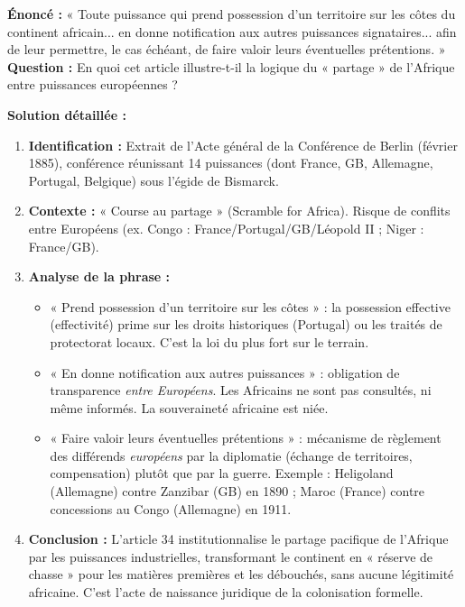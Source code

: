 \documentclass[11pt]{article}
\newcommand{\cle}[1]{{\popxbold\color{popdark}#1}}
\begin{document}
\begin{exoresolu}
\textbf{Énoncé :} « Toute puissance qui prend possession d'un territoire sur les côtes du continent africain... en donne notification aux autres puissances signataires... afin de leur permettre, le cas échéant, de faire valoir leurs éventuelles prétentions. »
\textbf{Question :} En quoi cet article illustre-t-il la logique du « partage » de l'Afrique entre puissances européennes ?

\textbf{Solution détaillée :}
\begin{enumerate}
    \item \textbf{Identification :} Extrait de l'Acte général de la Conférence de Berlin (février 1885), conférence réunissant 14 puissances (dont France, GB, Allemagne, Portugal, Belgique) sous l'égide de Bismarck.
    \item \textbf{Contexte :} « Course au partage » (Scramble for Africa). Risque de conflits entre Européens (ex. Congo : France/Portugal/GB/Léopold II ; Niger : France/GB).
    \item \textbf{Analyse de la phrase :} 
    \begin{itemize}
        \item « Prend possession d'un territoire sur les côtes » : la possession effective (\cle{effectivité}) prime sur les droits historiques (Portugal) ou les traités de protectorat locaux. C'est la loi du plus fort sur le terrain.
        \item « En donne notification aux autres puissances » : obligation de transparence \emph{entre Européens}. Les Africains ne sont pas consultés, ni même informés. La souveraineté africaine est niée.
        \item « Faire valoir leurs éventuelles prétentions » : mécanisme de règlement des différends \emph{européens} par la diplomatie (échange de territoires, compensation) plutôt que par la guerre. Exemple : Heligoland (Allemagne) contre Zanzibar (GB) en 1890 ; Maroc (France) contre concessions au Congo (Allemagne) en 1911.
    \end{itemize}
    \item \textbf{Conclusion :} L'article 34 institutionnalise le \cle{partage pacifique} de l'Afrique par les puissances industrielles, transformant le continent en « réserve de chasse » pour les matières premières et les débouchés, sans aucune légitimité africaine. C'est l'acte de naissance juridique de la colonisation formelle.
\end{enumerate}
\end{exoresolu}
\end{document}
